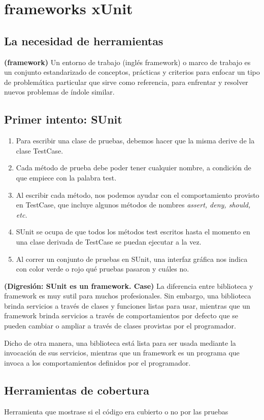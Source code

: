 \documentclass[../main.tex]{subfiles}
\begin{document}
\section{frameworks xUnit} 
    \subsection{La necesidad de herramientas}
        \begin{definition} \textbf{(framework)}
            Un entorno de trabajo (inglés framework) o marco de trabajo es un conjunto estandarizado de conceptos, prácticas y criterios para enfocar un tipo de problemática particular que sirve como referencia, para enfrentar y resolver nuevos problemas de índole similar.
        \end{definition}

    \subsection{Primer intento: SUnit}
        \begin{enumerate}
            \item Para escribir una clase de pruebas, debemos hacer que la misma derive de la clase TestCase.
            \item Cada método de prueba debe poder tener cualquier nombre, a condición de que empiece con la palabra test.
            \item Al escribir cada método, nos podemos ayudar con el comportamiento provisto en TestCase, que incluye algunos métodos de nombres \textit{assert, deny, should, etc.}
            \item SUnit se ocupa de que todos los métodos test escritos hasta el momento en una clase derivada de TestCase se puedan ejecutar a la vez.
            \item Al correr un conjunto de pruebas en SUnit, una interfaz gráfica nos indica con color verde o rojo qué pruebas pasaron y cuáles no.
        \end{enumerate}

        \begin{definition} \textbf{(Digresión: SUnit es un framework. Case)}
            La diferencia entre biblioteca y framework es muy sutil para muchos profesionales. Sin embargo, una biblioteca brinda servicios a través de clases y funciones listas para usar, mientras que un framework brinda servicios a través de comportamientos por defecto que se pueden cambiar o ampliar a través de clases provistas por el programador.

            Dicho de otra manera, una biblioteca está lista para ser usada mediante la invocación de sus servicios, mientras que un framework es un programa que invoca a los comportamientos definidos por el programador.           
        \end{definition}

    \subsection{Herramientas de cobertura}
        Herramienta que mostrase si el código era cubierto o no por las pruebas
\end{document}
